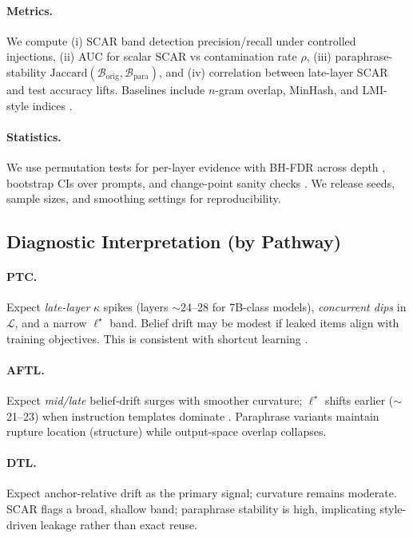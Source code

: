 \documentclass[11pt]{article}
\begin{document}
\paragraph{Metrics.} We compute (i) SCAR band detection precision/recall under controlled injections, (ii) AUC for scalar SCAR vs contamination rate $\rho$, (iii) paraphrase-stability $\mathrm{Jaccard}(\mathcal{B}_{\text{orig}},\mathcal{B}_{\text{para}})$, and (iv) correlation between late-layer SCAR and test accuracy lifts. Baselines include $n$-gram overlap, MinHash, and LMI-style indices \citep{broder1997minhash,raunak2023tokenoverlap,gudibande2023lmcontamination}.

\paragraph{Statistics.} We use permutation tests for per-layer evidence with BH-FDR across depth \citep{benjamini1995fdr}, bootstrap CIs over prompts, and change-point sanity checks \citep{truong2020cpd}. We release seeds, sample sizes, and smoothing settings for reproducibility.

\subsection*{Diagnostic Interpretation (by Pathway)}
\label{subsec:interpretation}
\paragraph{PTC.} Expect \emph{late-layer} $\kappa$ spikes (layers $\sim$24–28 for 7B-class models), \emph{concurrent dips} in $\mathcal{L}$, and a narrow $\ell^\star$ band. Belief drift may be modest if leaked items align with training objectives. This is consistent with shortcut learning \citep{geirhos2020shortcut}.

\paragraph{AFTL.} Expect \emph{mid/late} belief-drift surges with smoother curvature; $\ell^\star$ shifts earlier ($\sim$21–23) when instruction templates dominate \citep{ouyang2022instructgpt,bai2022harmless,rafailov2023dpo}. Paraphrase variants maintain rupture location (structure) while output-space overlap collapses.

\paragraph{DTL.} Expect anchor-relative drift as the primary signal; curvature remains moderate. SCAR flags a broad, shallow band; paraphrase stability is high, implicating style-driven leakage rather than exact reuse.
\end{document}
